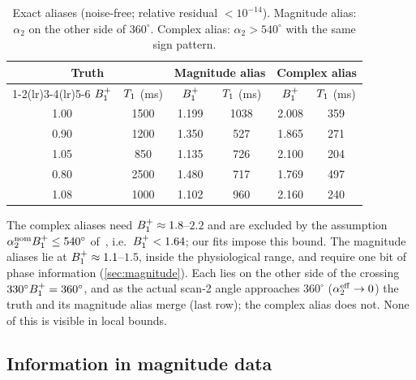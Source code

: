 \begin{table}[!htbp]
\centering
\caption{Exact aliases (noise-free; relative residual $<10^{-14}$). Magnitude alias: $\alpha_2$ on
the other side of $360^\circ$. Complex alias: $\alpha_2>540^\circ$ with the same sign pattern.}
\label{tab:aliases}
\small
\begin{tabular}{cccccc}
\toprule
\multicolumn{2}{c}{Truth} & \multicolumn{2}{c}{Magnitude alias} & \multicolumn{2}{c}{Complex alias}\\
\cmidrule(lr){1-2}\cmidrule(lr){3-4}\cmidrule(lr){5-6}
$B_1^{+}$ & $T_1$ (ms) & $B_1^{+}$ & $T_1$ (ms) & $B_1^{+}$ & $T_1$ (ms)\\
\midrule
1.00 & 1500 & 1.199 & 1038 & 2.008 & 359\\
0.90 & 1200 & 1.350 & 527 & 1.865 & 271\\
1.05 & 850 & 1.135 & 726 & 2.100 & 204\\
0.80 & 2500 & 1.480 & 717 & 1.769 & 497\\
1.08 & 1000 & 1.102 & 960 & 2.160 & 240\\
\bottomrule
\end{tabular}
\end{table}

The complex aliases need $B_1^{+}\approx1.8$--$2.2$ and are excluded by the assumption
$\alpha_2^{\rm nom}B_1^{+}\le540^\circ$ of~\cite{cheng2019}, i.e.\ $B_1^{+}<1.64$; our fits impose this bound.
The magnitude aliases lie at $B_1^{+}\approx1.1$--$1.5$, inside the physiological range, and
require one bit of phase information (\cref{sec:magnitude}). Each lies on the other side of the
crossing $330^\circ B_1^{+}=360^\circ$, and as the actual scan-2 angle approaches $360^\circ$ ($\alpha_2^{\rm eff}\to0$)
the truth and its magnitude alias merge (last row); the complex alias does not. None of this is
visible in local bounds.

\subsection{Information in magnitude data}\label{sec:rician}

